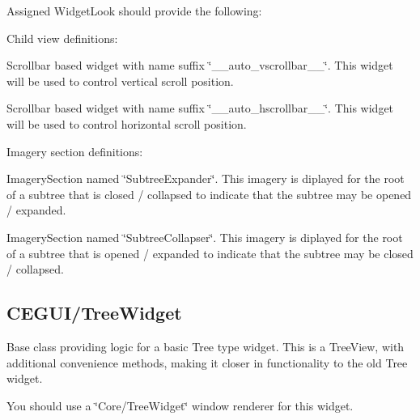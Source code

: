 Assigned Widget\+Look should provide the following\+: 
\begin{DoxyItemize}
\item Child view definitions\+: 
\begin{DoxyItemize}
\item Scrollbar based widget with name suffix \char`\"{}\+\_\+\+\_\+auto\+\_\+vscrollbar\+\_\+\+\_\+\char`\"{}. This widget will be used to control vertical scroll position. 
\item Scrollbar based widget with name suffix \char`\"{}\+\_\+\+\_\+auto\+\_\+hscrollbar\+\_\+\+\_\+\char`\"{}. This widget will be used to control horizontal scroll position. 
\end{DoxyItemize}


\item Imagery section definitions\+: 
\begin{DoxyItemize}
\item Imagery\+Section named \char`\"{}\+Subtree\+Expander\char`\"{}. This imagery is diplayed for the root of a subtree that is closed / collapsed to indicate that the subtree may be opened / expanded. 
\item Imagery\+Section named \char`\"{}\+Subtree\+Collapser\char`\"{}. This imagery is diplayed for the root of a subtree that is opened / expanded to indicate that the subtree may be closed / collapsed. 
\end{DoxyItemize}
\end{DoxyItemize}\hypertarget{fal_baseclass_ref_fal_baseclass_ref_sec_31}{}\subsection{C\+E\+G\+U\+I/\+Tree\+Widget}\label{fal_baseclass_ref_fal_baseclass_ref_sec_31}
Base class providing logic for a basic Tree type widget. This is a Tree\+View, with additional convenience methods, making it closer in functionality to the old Tree widget.

You should use a \char`\"{}\+Core/\+Tree\+Widget\char`\"{} window renderer for this widget.

